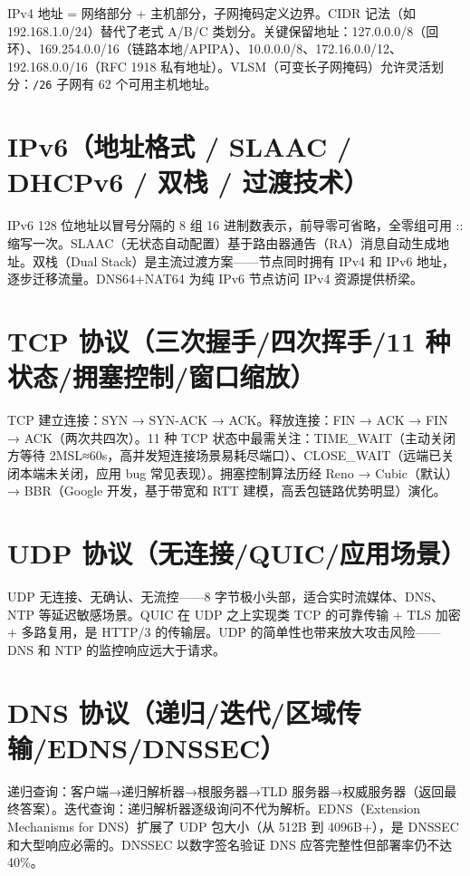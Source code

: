 \documentclass[12pt,UTF8]{ctexbook}
\begin{document}
IPv4 地址 = 网络部分 + 主机部分，子网掩码定义边界。CIDR 记法（如 192.168.1.0/24）替代了老式 A/B/C 类划分。关键保留地址：127.0.0.0/8（回环）、169.254.0.0/16（链路本地/APIPA）、10.0.0.0/8、172.16.0.0/12、192.168.0.0/16（RFC 1918 私有地址）。VLSM（可变长子网掩码）允许灵活划分：\verb|/26| 子网有 62 个可用主机地址。

  \section{IPv6（地址格式 / SLAAC / DHCPv6 / 双栈 / 过渡技术）}

IPv6 128 位地址以冒号分隔的 8 组 16 进制数表示，前导零可省略，全零组可用 :: 缩写一次。SLAAC（无状态自动配置）基于路由器通告（RA）消息自动生成地址。双栈（Dual Stack）是主流过渡方案——节点同时拥有 IPv4 和 IPv6 地址，逐步迁移流量。DNS64+NAT64 为纯 IPv6 节点访问 IPv4 资源提供桥梁。

  \section{TCP 协议（三次握手/四次挥手/11 种状态/拥塞控制/窗口缩放）}

TCP 建立连接：SYN → SYN-ACK → ACK。释放连接：FIN → ACK → FIN → ACK（两次共四次）。11 种 TCP 状态中最需关注：TIME\_WAIT（主动关闭方等待 2MSL≈60s，高并发短连接场景易耗尽端口）、CLOSE\_WAIT（远端已关闭本端未关闭，应用 bug 常见表现）。拥塞控制算法历经 Reno → Cubic（默认）→ BBR（Google 开发，基于带宽和 RTT 建模，高丢包链路优势明显）演化。

  \section{UDP 协议（无连接/QUIC/应用场景）}

UDP 无连接、无确认、无流控——8 字节极小头部，适合实时流媒体、DNS、NTP 等延迟敏感场景。QUIC 在 UDP 之上实现类 TCP 的可靠传输 + TLS 加密 + 多路复用，是 HTTP/3 的传输层。UDP 的简单性也带来放大攻击风险——DNS 和 NTP 的监控响应远大于请求。

  \section{DNS 协议（递归/迭代/区域传输/EDNS/DNSSEC）}

递归查询：客户端→递归解析器→根服务器→TLD 服务器→权威服务器（返回最终答案）。迭代查询：递归解析器逐级询问不代为解析。EDNS（Extension Mechanisms for DNS）扩展了 UDP 包大小（从 512B 到 4096B+），是 DNSSEC 和大型响应必需的。DNSSEC 以数字签名验证 DNS 应答完整性但部署率仍不达 40\%。
\end{document}
